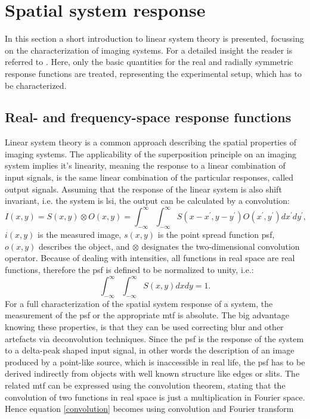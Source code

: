 \section{Spatial system response} \label{sec:ssr}
In this section a short introduction to linear system theory is presented, focussing on the characterization of imaging systems. For a detailed insight the reader is referred to \citep{Cunningham,Samei1998,Wagner1974,Wagner1977,Donath2007}. Here, only the basic quantities for the real and radially symmetric response functions are treated, representing the experimental setup, which has to be characterized.   
\subsection{Real- and frequency-space response functions } \label{subsec:ct} 
Linear system theory is a common approach describing the spatial properties of imaging systems. 
The applicability of the superposition principle on an imaging system implies it's linearity, 
meaning the response to a linear combination of input signals, 
is the same linear combination of the particular responses, called output signals. 
Assuming that the response of the linear system is also shift invariant, i.e. the system is \gls{lsi}, 
the output can be calculated by a convolution: 
\begin{equation}\label{convolution}
I(x,y) = S(x,y) \otimes O(x,y) = \int_{-\infty}^{\infty}\int_{-\infty}^{\infty}S(x-x^{'},y-y^{'})O(x^{'},y^{'})dx^{'}dy^{'},
\end{equation}
$i(x,y)$ is the measured image, $s(x,y)$ is the point spread function \gls{psf}, $o(x,y)$ describes the object, 
and $\otimes$ designates the two-dimensional convolution operator. Because of dealing with intensities, 
all functions in real space are real functions, therefore the \gls{psf} is defined to be normalized to unity, i.e.:
\begin{equation}
\int_{-\infty}^{\infty}\int_{-\infty}^{\infty} S(x,y)dxdy = 1.
\end{equation} 
For a full characterization of the spatial system response of a system, the measurement of the \gls{psf} or the appropriate \gls{mtf} is absolute. The big advantage knowing these properties, is that they can be used correcting blur and other artefacts via deconvolution techniques. Since the \gls{psf} is the response of the system to a delta-peak shaped input signal, in other words the description of an image produced by a point-like source, which is inaccessible in real life, the \gls{psf} has to be derived indirectly from objects with well known structure like edges or slits. The related \gls{mtf} can be expressed using the convolution theorem, stating that the convolution of two functions in real space is just a multiplication in Fourier space. Hence equation \ref{convolution} becomes using convolution and Fourier transform
